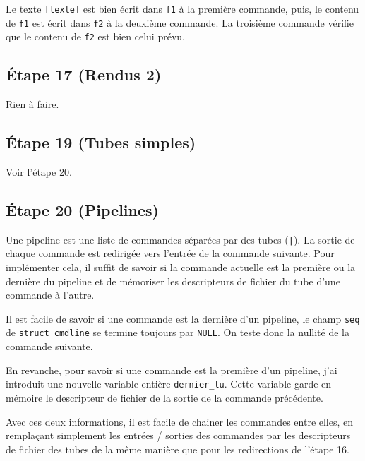 \documentclass{article}
\begin{document}
Le texte \texttt{[texte]} est bien écrit dans \texttt{f1} à la première commande, puis, le contenu de \texttt{f1} est écrit dans \texttt{f2} à la deuxième commande. La troisième commande vérifie que le contenu de \texttt{f2} est bien celui prévu.

\subsection*{Étape 17 (Rendus 2)}

Rien à faire.

\subsection*{Étape 19 (Tubes simples)}

Voir l'étape 20.

\subsection*{Étape 20 (Pipelines)}

Une pipeline est une liste de commandes séparées par des tubes (\texttt{|}). La sortie de chaque commande est redirigée vers l'entrée de la commande suivante. Pour implémenter cela, il suffit de savoir si la commande actuelle est la première ou la dernière du pipeline et de mémoriser les descripteurs de fichier du tube d'une commande à l'autre.

Il est facile de savoir si une commande est la dernière d'un pipeline, le champ \texttt{seq} de \texttt{struct cmdline} se termine toujours par \texttt{NULL}. On teste donc la nullité de la commande suivante.

En revanche, pour savoir si une commande est la première d'un pipeline, j'ai introduit une nouvelle variable entière \texttt{dernier\_lu}. Cette variable garde en mémoire le descripteur de fichier de la sortie de la commande précédente.

Avec ces deux informations, il est facile de chainer les commandes entre elles, en remplaçant simplement les entrées / sorties des commandes par les descripteurs de fichier des tubes de la même manière que pour les redirections de l'étape 16.
\end{document}
